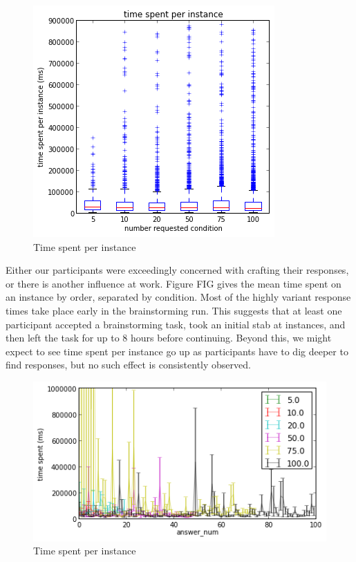 \begin{figure}[h]
    \centering
    \includegraphics[width=0.9\columnwidth]{time_spent_condition}
    \caption{Time spent per instance}
\end{figure}

Either our participants were exceedingly concerned with crafting their responses, or there is another influence at work. Figure FIG gives the mean time spent on an instance by order, separated by condition. Most of the highly variant response times take place early in the brainstorming run. This suggests that at least one participant accepted a brainstorming task, took an initial stab at instances, and then left the task for up to 8 hours before continuing. Beyond this, we might expect to see time spent per instance go up as participants have to dig deeper to find responses, but no such effect is consistently observed.

\begin{figure}[h]
    \centering
    \includegraphics[width=0.9\columnwidth]{time_spent_order}
    \caption{Time spent per instance}
\end{figure}


